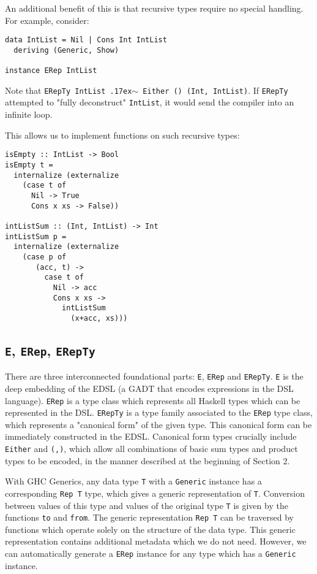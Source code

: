 \documentclass[sigplan,anonymous,review]{acmart}
\newcommand{\typeeq}{\raise.17ex\hbox{$\scriptstyle\mathtt{\sim}$}\,\;}
\newcommand{\ttt}{\texttt}
\begin{document}
An additional benefit of this is that recursive types require no special handling. For
example, consider:

\begin{lstlisting}
data IntList = Nil | Cons Int IntList
  deriving (Generic, Show)

instance ERep IntList
\end{lstlisting}

Note that \ttt{ERepTy IntList \typeeq Either () (Int, IntList)}. If \ttt{ERepTy}
attempted to "fully deconstruct" \ttt{IntList}, it would send the compiler
into an infinite loop.

This allows us to implement functions on such recursive types:

\begin{lstlisting}
isEmpty :: IntList -> Bool
isEmpty t =
  internalize (externalize
    (case t of
      Nil -> True
      Cons x xs -> False))

intListSum :: (Int, IntList) -> Int
intListSum p =
  internalize (externalize
    (case p of
       (acc, t) ->
         case t of
           Nil -> acc
           Cons x xs ->
             intListSum
               (x+acc, xs)))
\end{lstlisting}

\subsection{\ttt{E}, \ttt{ERep}, \ttt{ERepTy}}

There are three interconnected foundational parts: \ttt{E}, \ttt{ERep} and
\ttt{ERepTy}. \ttt{E} is the deep embedding of the EDSL (a GADT that encodes
expressions in the DSL language). \ttt{ERep} is a type class which represents
all Haskell types which can be represented in the DSL. \ttt{ERepTy} is a type
family associated to the \ttt{ERep} type class, which represents a "canonical form"
of the given type. This canonical form can be immediately constructed in the EDSL.
Canonical form types crucially include \ttt{Either} and \ttt{(,)}, which
allow all combinations of basic sum types and product types to be encoded, in the
manner described at the beginning of Section 2.

With GHC Generics, any data type \ttt{T} with a \ttt{Generic} instance has a
corresponding \ttt{Rep T} type, which gives a generic representation of \ttt{T}.
Conversion between values of this type and values of the original type \ttt{T} is
given by the functions \ttt{to} and \ttt{from}. The generic representation \ttt{Rep T}
can be traversed by functions which operate solely on the structure of the data type.
This generic representation contains additional metadata which we do not need.
However, we can automatically generate a \ttt{ERep} instance for any type which
has a \ttt{Generic} instance.
\end{document}
